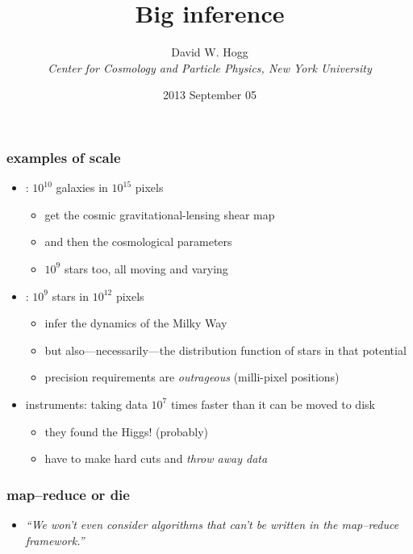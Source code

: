 \documentclass[pdftex]{beamer}
\title{Big inference}
\author[David W. Hogg (NYU)]{David W. Hogg \\
  \textsl{\small Center for Cosmology and Particle Physics,
                 New York University}}
\date{2013 September 05}
\begin{document}
\begin{frame}
  \titlepage
\end{frame}

\begin{frame}
  \frametitle{examples of scale}
  \begin{itemize}
  \item {}: $10^{10}$ galaxies in $10^{15}$ pixels
    \begin{itemize}
    \item get the cosmic gravitational-lensing shear map
    \item and then the cosmological parameters
    \item $10^9$ stars too, all moving and varying
    \end{itemize}
  \item {}: $10^{9}$ stars in $10^{12}$ pixels
    \begin{itemize}
    \item infer the dynamics of the Milky Way
    \item but also---necessarily---the distribution function of stars
      in that potential
    \item precision requirements are \emph{outrageous} (milli-pixel positions)
    \end{itemize}
  \item {} instruments: taking data $10^7$ times faster than it can be moved to disk
    \begin{itemize}
    \item they found the Higgs! (probably)
    \item have to make hard cuts and \emph{throw away data}
    \end{itemize}
  \end{itemize}
\end{frame}

\begin{frame}
  \frametitle{map--reduce or die}
  \begin{itemize}
  \item \textsl{``We won't even consider algorithms that can't be
    written in the map--reduce framework.''}
  \end{itemize}
\end{frame}
\end{document}

